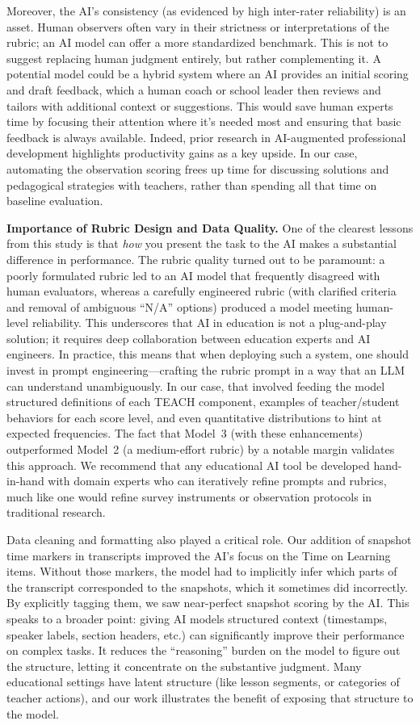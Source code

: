 \documentclass[12pt]{article}
\begin{document}
Moreover, the AI’s consistency (as evidenced by high inter-rater reliability) is an asset. Human observers often vary in their strictness or interpretations of the rubric; an AI model can offer a more standardized benchmark. This is not to suggest replacing human judgment entirely, but rather complementing it. A potential model could be a hybrid system where an AI provides an initial scoring and draft feedback, which a human coach or school leader then reviews and tailors with additional context or suggestions. This would save human experts time by focusing their attention where it’s needed most and ensuring that basic feedback is always available. Indeed, prior research in AI-augmented professional development highlights productivity gains as a key upside. In our case, automating the observation scoring frees up time for discussing solutions and pedagogical strategies with teachers, rather than spending all that time on baseline evaluation.

\textbf{Importance of Rubric Design and Data Quality.} One of the clearest lessons from this study is that \emph{how} you present the task to the AI makes a substantial difference in performance. The rubric quality turned out to be paramount: a poorly formulated rubric led to an AI model that frequently disagreed with human evaluators, whereas a carefully engineered rubric (with clarified criteria and removal of ambiguous “N/A” options) produced a model meeting human-level reliability. This underscores that AI in education is not a plug-and-play solution; it requires deep collaboration between education experts and AI engineers. In practice, this means that when deploying such a system, one should invest in prompt engineering—crafting the rubric prompt in a way that an LLM can understand unambiguously. In our case, that involved feeding the model structured definitions of each TEACH component, examples of teacher/student behaviors for each score level, and even quantitative distributions to hint at expected frequencies. The fact that Model~3 (with these enhancements) outperformed Model~2 (a medium-effort rubric) by a notable margin validates this approach. We recommend that any educational AI tool be developed hand-in-hand with domain experts who can iteratively refine prompts and rubrics, much like one would refine survey instruments or observation protocols in traditional research.

Data cleaning and formatting also played a critical role. Our addition of snapshot time markers in transcripts improved the AI’s focus on the Time on Learning items. Without those markers, the model had to implicitly infer which parts of the transcript corresponded to the snapshots, which it sometimes did incorrectly. By explicitly tagging them, we saw near-perfect snapshot scoring by the AI. This speaks to a broader point: giving AI models structured context (timestamps, speaker labels, section headers, etc.) can significantly improve their performance on complex tasks. It reduces the “reasoning” burden on the model to figure out the structure, letting it concentrate on the substantive judgment. Many educational settings have latent structure (like lesson segments, or categories of teacher actions), and our work illustrates the benefit of exposing that structure to the model.
\end{document}
